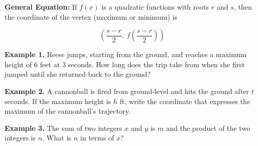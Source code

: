 \bigskip
\textbf{General Equation:} If $f(x)$ is a quadratic functions with roots $r$ and $s$, then the coordinate of the vertex (maximum or minimum) is

\[\left(\frac{s-r}{2},\ f\left(\frac{s-r}{2}\right)\right)\]

\vfill
\textbf{Example 1.} Reese jumps, starting from the ground, and reaches a maximum height of 6 feet at 3 seconds. How long does the trip take from when she first jumped until she returned back to the ground?

\vfill
\textbf{Example 2.} A cannonball is fired from ground-level and hits the ground after $t$ seconds. If the maximum height is $h$ ft, write the coordinate that expresses the maximum of the cannonball's trajectory.

\vfill
\textbf{Example 3.} The sum of two integers $x$ and $y$ is $m$ and the product of the two integers is $n$. What is $n$ in terms of $x$?

